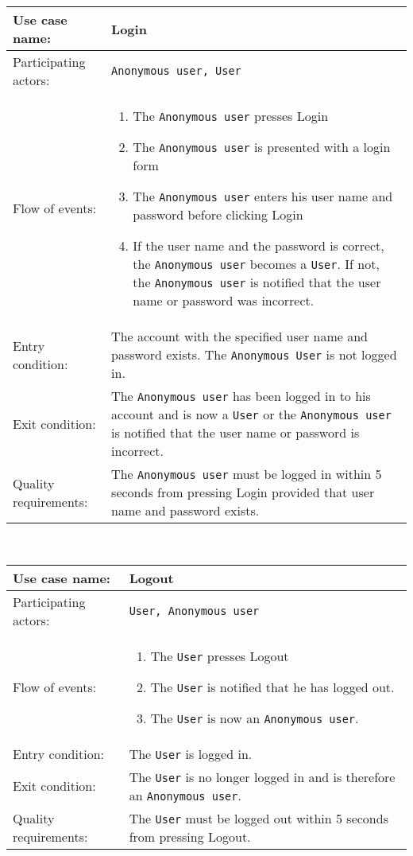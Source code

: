 \documentclass{article}
\begin{document}
\noindent
\begin{tabular}{| l | p{8cm} |}
  \hline                        
 Use case name:  & Login   \\   \hline                
 Participating actors:  & \texttt{Anonymous user, User} \\   \hline          
  Flow of events: & \begin{enumerate}
\item{The \texttt{Anonymous user} presses Login}
\item{The \texttt{Anonymous user} is presented with a login form}
\item{The \texttt{Anonymous user} enters his user name and password before clicking Login}
\item{If the user name and the password is correct, the \texttt{Anonymous user} becomes a \texttt{User}. If not, the \texttt{Anonymous user} is notified that the user name or password was incorrect.}
\end{enumerate}
 \\   \hline 
Entry condition: & The account with the specified user name and password exists. The \texttt{Anonymous User} is not logged in. \\ \hline
Exit condition: & The \texttt{Anonymous user} has been logged in to his account and is now a \texttt{User} or the \texttt{Anonymous user} is notified that the user name or password is incorrect. \\ \hline
Quality requirements: & The \texttt{Anonymous user} must be logged in within 5 seconds from pressing Login provided that user name and password exists. \\ \hline             
\end{tabular} \\

\noindent
\begin{tabular}{| l | p{8cm} |}
  \hline                        
 Use case name:  & Logout   \\   \hline                
 Participating actors:  & \texttt{User, Anonymous user} \\   \hline          
  Flow of events: & \begin{enumerate}
\item{The \texttt{User} presses Logout}
\item{The \texttt{User} is notified that he has logged out.}
\item{The \texttt{User} is now an \texttt{Anonymous user}.}
\end{enumerate}
 \\   \hline 
Entry condition: & The \texttt{User} is logged in. \\ \hline
Exit condition: & The \texttt{User} is no longer logged in and is therefore an \texttt{Anonymous user}. \\ \hline
Quality requirements: & The \texttt{User} must be logged out within 5 seconds from pressing Logout. \\ \hline             
\end{tabular} \\
\end{document}
